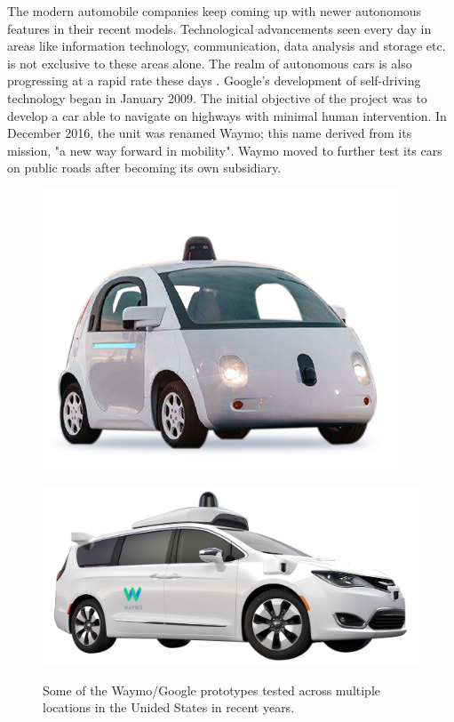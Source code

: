 The modern automobile companies keep coming up with newer autonomous features in their recent models. Technological advancements seen every day in areas like information technology, communication, data analysis and storage etc. is not exclusive to these areas alone. The realm of autonomous cars is also progressing at a rapid rate these days \cite{Bimbraw2015}. Google's development of self-driving technology began in January 2009. The initial objective of the project was to develop a car able to navigate on highways with minimal human intervention. In December 2016, the unit was renamed Waymo; this name derived from its mission, "a new way forward in mobility". Waymo moved to further test its cars on public roads after becoming its own subsidiary.
\begin{figure}[!h]
	\centering
	\begin{minipage}[t]{0.45\textwidth}
		\includegraphics[width=\textwidth]{./figure/veiculos0.png}
		\label{fig:veiculos0}
	\end{minipage}
	\begin{minipage}[t]{0.45\textwidth}
		\includegraphics[width=\textwidth]{./figure/veiculos1.png}
		\label{fig:veiculos1}
	\end{minipage}
	\caption{Some of the Waymo/Google prototypes tested across multiple locations in the Unided States in recent years.}
	\label{fig:waymo}
\end{figure}

